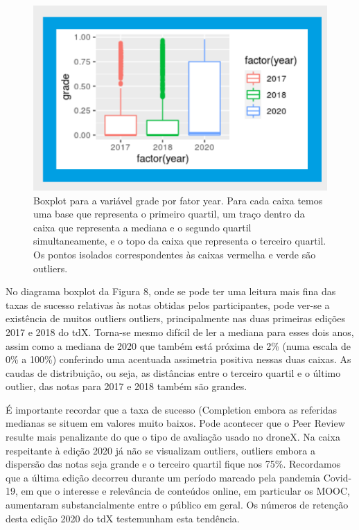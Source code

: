 \begin{figure}
    \centering
    \includegraphics[width=.9\textwidth]{chaps/Images/boxplot_grade_tdx.png}
    \caption{Boxplot para a variável grade por fator year. Para cada caixa temos uma base que representa o primeiro quartil, um traço dentro da caixa que representa a mediana e o segundo quartil simultaneamente, e o topo da caixa que
representa o terceiro quartil. Os pontos isolados correspondentes às caixas vermelha e verde são outliers.}
    \label{fig:boxplot_grade_tdx}
\end{figure}

No diagrama boxplot da Figura 8, onde se pode ter uma leitura mais fina das taxas de sucesso relativas às notas obtidas pelos participantes, pode ver-se a existência de
muitos outliers outliers, principalmente nas duas primeiras edições 2017 e 2018 do tdX. Torna-se mesmo difícil de ler a mediana para esses dois anos, assim como a mediana
de 2020 que também está próxima de 2\% (numa escala de 0\% a 100\%) conferindo uma acentuada assimetria positiva nessas duas caixas. As caudas de distribuição, ou seja, as distâncias entre o terceiro quartil e o último
outlier, das notas para 2017 e 2018 também são grandes.

É importante recordar que a taxa de sucesso (Completion embora as referidas medianas se situem em valores muito baixos. Pode acontecer que o Peer Review resulte mais penalizante do que o tipo de avaliação usado no droneX. Na caixa respeitante à edição 2020 já não se visualizam outliers, outliers embora a dispersão das notas seja grande e o terceiro quartil fique nos 75\%. Recordamos que a última edição decorreu durante um período marcado pela pandemia Covid-19, em que o interesse e relevância de conteúdos online, em particular os MOOC, aumentaram substancialmente entre o público em geral. Os números de retenção desta edição 2020 do tdX
testemunham esta tendência.


